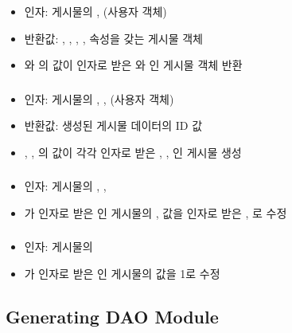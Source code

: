 \subsubsection*{}
\begin{itemize}
    \item 인자: 게시물의 ,  (사용자 객체)
    \item 반환값: , , , ,  속성을 갖는 게시물 객체
    \item {}와 의 값이 인자로 받은 와 인 게시물 객체 반환
\end{itemize}

\subsubsection*{}
\begin{itemize}
    \item 인자: 게시물의 , ,  (사용자 객체)
    \item 반환값: 생성된 게시물 데이터의 ID 값
    \item {}, , 의 값이 각각 인자로 받은 , , 인 게시물 생성
\end{itemize}

\subsubsection*{}
\begin{itemize}
    \item 인자: 게시물의 , , 
    \item {}가 인자로 받은 인 게시물의 ,  값을 인자로 받은 , 로 수정
\end{itemize}

\subsubsection*{}
\begin{itemize}
    \item 인자: 게시물의 
    \item {}가 인자로 받은 인 게시물의  값을 1로 수정
\end{itemize}

\subsection*{Generating DAO Module}

